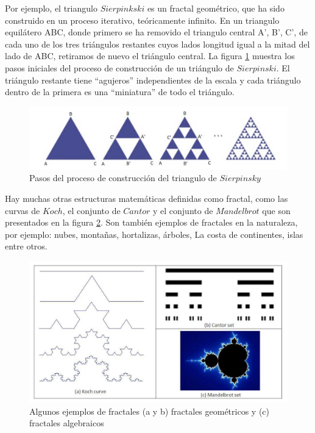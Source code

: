 Por ejemplo, el triangulo $Sierpinkski$ es un fractal geométrico, que ha sido construido en un proceso iterativo, teóricamente infinito.  En un triangulo equilátero ABC, donde primero se ha removido el triangulo central A', B', C',  de cada uno de los tres triángulos restantes cuyos lados longitud igual a la mitad del lado de ABC, retiramos de nuevo el triángulo central. La figura \ref{fig:ima1} muestra los pasos iniciales del proceso de construcción de un triángulo de $Sierpinski$. El triángulo restante tiene ``agujeros'' independientes de la escala y cada triángulo dentro de la primera es una ``miniatura'' de todo el triángulo.
\begin{figure}[h]
\centering
\includegraphics[scale=0.75]{chapter4/ima1.png}
\caption{Pasos del proceso de construcción del triangulo de $Sierpinsky$}
\label{fig:ima1}
\end{figure}
Hay muchas otras estructuras matemáticas definidas como fractal, como las curvas de   $Koch$,  el conjunto de $Cantor$ y el conjunto de $Mandelbrot$ que son presentados en la figura \ref{fig:ima2}. Son también ejemplos de fractales en la naturaleza, por ejemplo: nubes, montañas, hortalizas, árboles, La costa de continentes, islas entre otros.
\begin{figure}[h]
\centering
\includegraphics[scale=1.2]{chapter4/ima2.png}
\caption{Algunos ejemplos de fractales (a y b) fractales geométricos y (c) fractales algebraicos}
\label{fig:ima2}
\end{figure}


